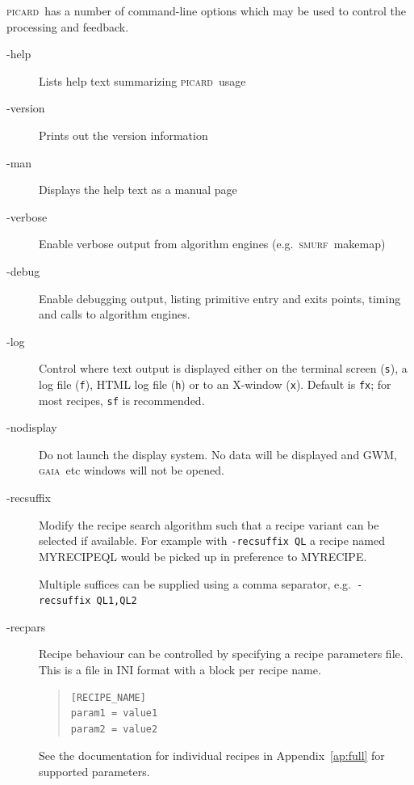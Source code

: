 \documentclass[twoside,11pt]{article}
\renewcommand{\_}{\texttt{\symbol{95}}}
\newenvironment{myquote}{\begin{quote}\begin{small}}{\end{small}\end{quote}}
\newcommand{\GAIA}{\textsc{gaia}}
\newcommand{\SMURF}{\textsc{smurf}}
\newcommand{\picard}{\textsc{picard}}
\newcommand{\task}[1]{\textsf{#1}}
\begin{document}
\picard\ has a number of command-line options which may be used to
control the processing and feedback.

\begin{description}
\item[-help] \mbox{}

  Lists help text summarizing \picard\ usage

\item[-version] \mbox{}

  Prints out the version information

\item[-man] \mbox{}

  Displays the help text as a manual page

\item[-verbose] \mbox{}

  Enable verbose output from algorithm engines (e.g.\ \SMURF\ \task{makemap})

\item[-debug] \mbox{}

  Enable debugging output, listing primitive entry and exits points,
  timing and calls to algorithm engines.

\item[-log] \mbox{}

  Control where text output is displayed either on the terminal screen
  (\texttt{s}), a log file (\texttt{f}), HTML log file (\texttt{h}) or
  to an X-window (\texttt{x}). Default is \texttt{fx}; for most
  recipes, \texttt{sf} is recommended.

\item[-nodisplay] \mbox{}

  Do not launch the display system. No data will be displayed and GWM,
  \GAIA\ etc windows will not be opened.

\item[-recsuffix] \mbox{}

  Modify the recipe search algorithm such that a recipe variant can be
  selected if available. For example with \texttt{-recsuffix QL} a
  recipe named \task{MYRECIPE\_QL} would be picked up in preference to
  \task{MYRECIPE}.

  Multiple suffices can be supplied using a comma separator, e.g.\
  \texttt{-recsuffix QL1,QL2}

\item[-recpars] \mbox{}

  Recipe behaviour can be controlled by specifying a recipe parameters
  file. This is a file in INI format with a block per recipe name.
\begin{myquote}
\begin{verbatim}
[RECIPE_NAME]
param1 = value1
param2 = value2
\end{verbatim}
\end{myquote}
See the documentation for individual recipes in Appendix~\ref{ap:full}
for supported parameters.

\end{description}
\end{document}
